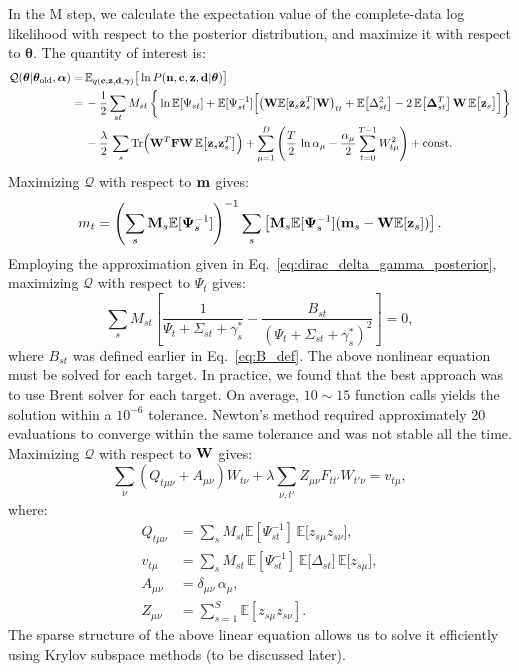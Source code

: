 \documentclass[nofootinbib,amssymb,amsmath]{revtex4}
\newcommand{\vd}{{\bf d}}
\newcommand{\vc}{{\bf c}}
\newcommand{\vz}{{\bf z}}
\newcommand{\vn}{{\bf n}}
\newcommand{\vm}{{\bf m}}
\newcommand{\vM}{{\bf M}}
\newcommand{\vW}{{\bf W}}
\newcommand{\vF}{{\bf F}}
\newcommand{\vgamma}{{\bm \gamma}}
\newcommand{\vPsi}{{\bf \Psi}}
\newcommand{\vDelta}{{\bf \Delta}}
\newcommand{\vtheta}{{\boldsymbol \theta}}
\newcommand{\valpha}{{\boldsymbol \alpha}}
\newcommand{\EE}{\mathbb{E}}
\begin{document}
In the M step, we calculate the expectation value of the complete-data log likelihood with respect to the posterior distribution, and maximize it with respect to $\vtheta$. The quantity of interest is:
%
\begin{align}
\mathcal{Q}(\vtheta|\vtheta_\mathrm{old}, \valpha) =&\, \EE_{q(\vc, \vz, \vd, \vgamma)}\big[\ln P(\vn, \vc, \vz, \vd | \vtheta)\big]\nonumber\\
=&\, - \frac{1}{2}\sum_{st} M_{st} \, \bigg\{\ln \EE[\Psi_{st}] + \EE[\Psi_{st}^{-1}]\Big[\big(\vW \EE[\vz_s \vz_s^T] \vW\big)_{tt} + \EE\big[\Delta_{st}^2\big] - 2 \, \EE\big[\vDelta_{st}^T\big] \, \vW \, \EE\big[\vz_s\big]\Big]\bigg\}\nonumber\\
&\,- \frac{\lambda}{2} \, \sum_s \mathrm{Tr}\Big(\vW^T \vF \vW \, \EE\big[\vz_s \vz_s^T\big]\Big) + \sum_{\mu=1}^{D}\left(\frac{T}{2} \, \ln \alpha_\mu -\frac{\alpha_\mu}{2} \sum_{t=0}^{T-1} W_{t\mu}^2  \right) + \mathrm{const.}
\label{eq:posterior_exp_log_likelihood}
\end{align}
%
Maximizing $\mathcal{Q}$ with respect to $\vm$ gives:
\begin{align}
m_t = \left(\sum_s \vM_s \EE[\vPsi_{s}^{-1}] \right)^{-1} \sum_s \left[ \vM_s \EE[\vPsi_{s}^{-1}]  (\vm_{s}  - \vW  \EE[\vz_{s}] ) \right].
\end{align}
Employing the approximation given in Eq.~\eqref{eq:dirac_delta_gamma_posterior}, maximizing $\mathcal{Q}$ with respect to $\Psi_t$ gives:
\begin{equation}\label{eq:psi_stationarity}
\sum_s M_{st}\left[\frac{1}{\Psi_t + \Sigma_{st} + \gamma^*_s} - \frac{B_{st}}{(\Psi_t + \Sigma_{st} + \gamma^*_s)^2} \right] = 0,
\end{equation}
where $B_{st}$ was defined earlier in Eq.~\eqref{eq:B_def}. The above nonlinear equation must be solved for each target. In practice, we found that the best approach was to use Brent solver for each target. On average, $10 \sim 15$ function calls yields the solution within a $10^{-6}$ tolerance. Newton's method required approximately 20 evaluations to converge within the same tolerance and was not stable all the time.\\

\noindent Maximizing $\mathcal{Q}$ with respect to $\vW$ gives:
\begin{equation}\label{eq:W_eq_reg}
\sum_{\nu} \left(Q_{t\mu\nu} + A_{\mu\nu}\right) W_{t\nu} + \lambda \sum_{\nu,t'} Z_{\mu\nu} F_{tt'} W_{t'\nu} = v_{t\mu},
\end{equation}
where:
\begin{align}
Q_{t\mu\nu} &= \sum_s M_{st} \EE[\Psi_{st}^{-1}] \, \EE\big[z_{s\mu} z_{s\nu}\big],\nonumber\\
v_{t\mu} &= \sum_s M_{st} \, \EE[\Psi_{st}^{-1}] \, \EE\big[\Delta_{st}\big] \, \EE\big[z_{s\mu}\big],\nonumber\\
A_{\mu\nu} &= \delta_{\mu\nu}\,\alpha_{\mu},\nonumber\\
Z_{\mu\nu} &= \sum_{s=1}^S \EE[z_{s\mu} z_{s\nu}].
\end{align}
The sparse structure of the above linear equation allows us to solve it efficiently using Krylov subspace methods (to be discussed later).\\
\end{document}
